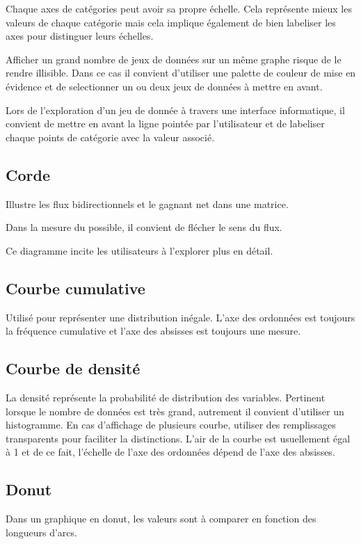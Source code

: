 \documentclass[a4paper,12pt]{article}
\begin{document}
\begin{multicols}{2}
Chaque axes de catégories peut avoir sa propre échelle. Cela représente mieux les valeurs de chaque catégorie mais cela implique également de bien labeliser les axes pour distinguer leurs échelles. \autocite{jonathanschwabishRelationship2021}

Afficher un grand nombre de jeux de données sur un même graphe risque de le rendre illisible. \autocite{jonathanschwabishRelationship2021} Dans ce cas il convient d'utiliser une palette de couleur de mise en évidence et de selectionner un ou deux jeux de données à mettre en avant.

Lors de l'exploration d'un jeu de donnée à travers une interface informatique, il convient de mettre en avant la ligne pointée par l'utilisateur et de labeliser chaque points de catégorie avec la valeur associé. \autocite{sosulskiGraphics2019}
\subsection*{Corde}
\label{sec:orgb084838}
Illustre les flux bidirectionnels et le gagnant net dans une matrice. \autocite{alansmithLexiqueVisuel}

Dans la mesure du possible, il convient de flécher le sens du flux.

Ce diagramme incite les utilisateurs à l'explorer plus en détail. \autocite{jonathanschwabishRelationship2021}
\subsection*{Courbe cumulative}
\label{sec:org647e46a}
Utilisé pour représenter une distribution inégale. L'axe des ordonnées est toujours la fréquence cumulative et l'axe des absisses est toujours une mesure. \autocite{alansmithLexiqueVisuel}
\subsection*{Courbe de densité}
\label{sec:org4be834f}
La densité représente la probabilité de distribution des variables. \autocite{sosulskiGraphics2019} Pertinent lorsque le nombre de données est très grand, autrement il convient d'utiliser un histogramme. \autocite{wilkeVisualizingManyDistributions2019} En cas d'affichage de plusieurs courbe, utiliser  des remplissages transparents pour faciliter la distinctions. L'air de la courbe est usuellement égal à 1 et de ce fait, l'échelle de l'axe des ordonnées dépend de l'axe des absisses. \autocite{wilkeVisualizingManyDistributions2019}
\subsection*{Donut}
\label{sec:org8153e38}
Dans un graphique en donut, les valeurs sont à comparer en fonction des longueurs d'arcs.


\end{multicols}
\end{document}
